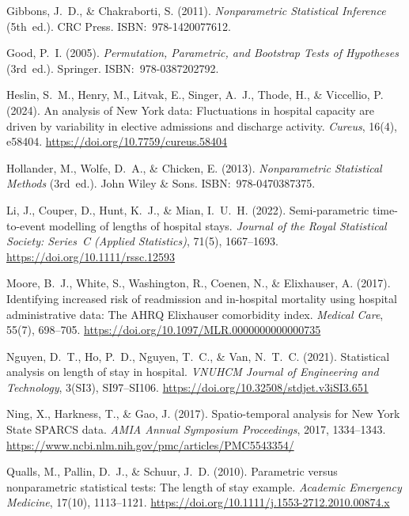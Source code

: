 \documentclass[12pt]{article}
\begin{document}
\begin{enumerate}[label={[\arabic*]}, leftmargin=*, nosep]
\item Gibbons, J.~D., \& Chakraborti, S. (2011). \textit{Nonparametric
  Statistical Inference} (5th~ed.). CRC Press.
  ISBN:~978-1420077612.

\item Good, P.~I. (2005). \textit{Permutation, Parametric, and
  Bootstrap Tests of Hypotheses} (3rd~ed.). Springer.
  ISBN:~978-0387202792.

\item Heslin, S.~M., Henry, M., Litvak, E., Singer, A.~J., Thode, H.,
  \& Viccellio, P. (2024). An analysis of New York data:
  Fluctuations in hospital capacity are driven by variability in
  elective admissions and discharge activity. \textit{Cureus},
  16(4), e58404. \url{https://doi.org/10.7759/cureus.58404}

\item Hollander, M., Wolfe, D.~A., \& Chicken, E. (2013).
  \textit{Nonparametric Statistical Methods} (3rd~ed.). John Wiley
  \& Sons. ISBN:~978-0470387375.

\item Li, J., Couper, D., Hunt, K.~J., \& Mian, I.~U.~H. (2022).
  Semi-parametric time-to-event modelling of lengths of hospital
  stays. \textit{Journal of the Royal Statistical Society:
  Series~C (Applied Statistics)}, 71(5), 1667--1693.
  \url{https://doi.org/10.1111/rssc.12593}

\item Moore, B.~J., White, S., Washington, R., Coenen, N., \&
  Elixhauser, A. (2017). Identifying increased risk of readmission
  and in-hospital mortality using hospital administrative data:
  The AHRQ Elixhauser comorbidity index. \textit{Medical Care},
  55(7), 698--705.
  \url{https://doi.org/10.1097/MLR.0000000000000735}

\item Nguyen, D.~T., Ho, P.~D., Nguyen, T.~C., \& Van, N.~T.~C.
  (2021). Statistical analysis on length of stay in hospital.
  \textit{VNUHCM Journal of Engineering and Technology}, 3(SI3),
  SI97--SI106. \url{https://doi.org/10.32508/stdjet.v3iSI3.651}

\item Ning, X., Harkness, T., \& Gao, J. (2017). Spatio-temporal
  analysis for New York State SPARCS data. \textit{AMIA Annual
  Symposium Proceedings}, 2017, 1334--1343.
  \url{https://www.ncbi.nlm.nih.gov/pmc/articles/PMC5543354/}

\item Qualls, M., Pallin, D.~J., \& Schuur, J.~D. (2010). Parametric
  versus nonparametric statistical tests: The length of stay example.
  \textit{Academic Emergency Medicine}, 17(10), 1113--1121.
  \url{https://doi.org/10.1111/j.1553-2712.2010.00874.x}


\end{enumerate}
\end{document}
